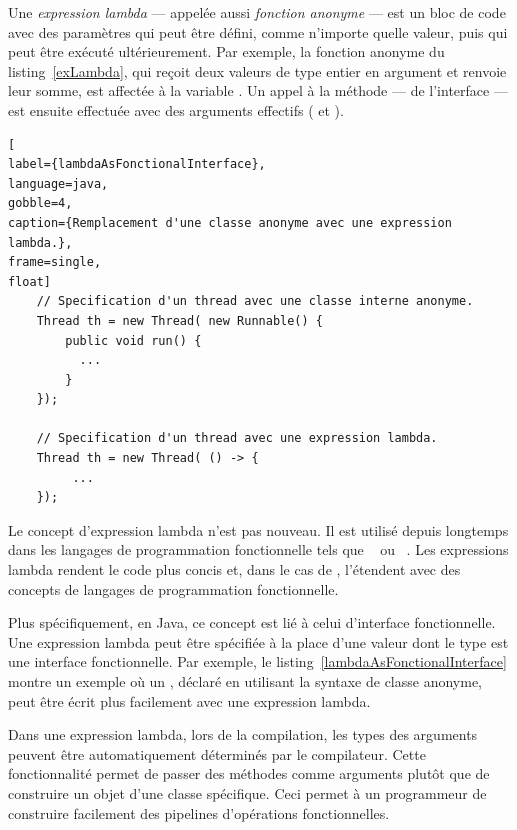 Une \emph{expression lambda} ---  appel\'ee aussi \emph{fonction anonyme} --- est un bloc de code avec des param\`etres qui peut \^etre d\'efini, comme n'importe quelle valeur, puis qui peut \^etre ex\'ecut\'e ult\'erieurement. Par exemple, la fonction anonyme du listing~\ref{exLambda}, qui re\c{c}oit deux valeurs de type entier en argument et renvoie leur somme, est affect\'ee \`a la variable . Un appel \`a la m\'ethode  --- de l'interface  --- est ensuite effectu\'ee avec des arguments effectifs ( et ).


\begin{lstlisting}[
label={lambdaAsFonctionalInterface},
language=java,
gobble=4,
caption={Remplacement d'une classe anonyme avec une expression lambda.},
frame=single,
float]
    // Specification d'un thread avec une classe interne anonyme.
	Thread th = new Thread( new Runnable() {
		public void run() {
          ...
		}
	});

    // Specification d'un thread avec une expression lambda.
	Thread th = new Thread( () -> {
         ...
	});
\end{lstlisting}



Le concept d'expression lambda n'est pas nouveau. Il est utilis\'e depuis longtemps dans les langages de programmation fonctionnelle tels que ~\citep{Steele84} ou ~\citep{HudakWad90,hutton2016programming}.
%
Les expressions lambda rendent le code plus concis et, dans le cas de , l'\'etendent avec des concepts de langages de programmation fonctionnelle. 

Plus sp\'ecifiquement, en Java, ce concept est li\'e \`a celui d'interface fonctionnelle. Une expression lambda peut \^etre sp\'ecifi\'ee \`a la place d'une valeur dont le type est une interface fonctionnelle. Par exemple, le listing~\ref{lambdaAsFonctionalInterface} montre un exemple o\`u un , d\'eclar\'e en utilisant la syntaxe de classe anonyme, peut \^etre \'ecrit plus facilement avec une expression lambda.

Dans une expression lambda, lors de la compilation, les types des arguments peuvent \^etre automatiquement d\'etermin\'es par le compilateur. Cette fonctionnalit\'e permet de passer des m\'ethodes comme arguments plut\^ot que de construire un objet d'une classe sp\'ecifique. Ceci permet \`a un programmeur de construire facilement des pipelines d'op\'erations fonctionnelles.


